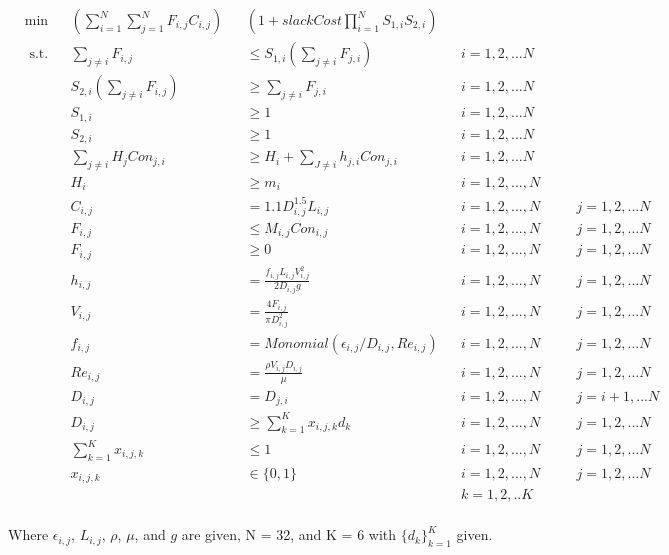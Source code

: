 \documentclass[12pt]{article}
\begin{document}
\begin{equation}
\begin{aligned}
	&\min &&(\sum_{i=1}^{N}\sum_{j=1}^{N} F_{i,j} C_{i,j})&&(1 + slackCost \prod_{i=1}^{N}S_{1,i}S_{2,i})\\
    & \text{ s.t.} && \sum_{j \neq i} F_{i,j} && \leq S_{1,i}(\sum_{j \neq i} F_{j,i}) \quad && i = 1, 2, ... N\\
	& && S_{2,i}(\sum_{j \neq i} F_{i,j}) && \geq \sum_{j \neq i} F_{j,i} \quad && i = 1, 2, ... N\\
	& && S_{1,i} && \geq 1 \quad && i = 1, 2, ... N\\
	& && S_{2,i} && \geq 1 \quad && i = 1, 2, ... N\\
    & && \sum_{j \neq i} H_j Con_{j,i} && \geq H_i + \sum_{J \neq i} h_{j,i}Con_{j,i} && i = 1,2, ...N\\
    & && H_i && \geq m_i && i = 1, 2, ..., N \\
    & && C_{i,j} && = 1.1 D_{i,j}^{1.5} L_{i,j} && i = 1, 2, ..., N \quad && j = 1, 2, ... N\\
    & && F_{i,j} && \leq M_{i,j} Con_{i,j} && i = 1, 2, ..., N \quad && j = 1, 2, ... N\\
    & && F_{i,j} && \geq 0 && i = 1, 2, ..., N \quad && j = 1, 2, ... N\\
    & && h_{i,j} && = \frac{f_{i,j} L_{i,j} V_{i,j}^2}{2D_{i,j} g} && i = 1, 2, ..., N \quad && j = 1, 2, ... N\\
    & && V_{i,j} && = \frac{4 F_{i,j}}{\pi D_{i,j}^2} && i = 1, 2, ..., N \quad && j = 1, 2, ... N\\
    & && f_{i,j} &&= Monomial(\epsilon_{i,j}/D_{i,j}, Re_{i,j}) && i = 1, 2, ..., N \quad && j = 1, 2, ... N\\
    & && Re_{i,j} && = \frac{\rho V_{i,j} D_{i,j}}{\mu} && i = 1, 2, ..., N \quad && j = 1, 2, ... N\\
    & && D_{i,j} && = D_{j,i} && i = 1, 2, ..., N \quad && j = i+1, ... N\\
    & && D_{i,j} && \geq \sum_{k=1}^{K}x_{i,j,k}d_k && i = 1, 2, ..., N \quad && j = 1, 2, ... N\\
    & && \sum_{k=1}^{K} x_{i,j,k} && \leq 1 && i = 1, 2, ..., N \quad && j = 1, 2, ... N\\
    & && x_{i,j,k} && \in \{0,1\} && i = 1, 2, ..., N \quad && j = 1, 2, ... N \\
    & && && && k = 1,2, ..K\\ 
\end{aligned}
\end{equation}

Where $\epsilon_{i,j}$, $L_{i,j}$, $\rho$, $\mu$, and $g$ are given, N = 32, and K = 6 with $\{d_k\}_{k=1}^{K}$ given. 

 
\end{document}
